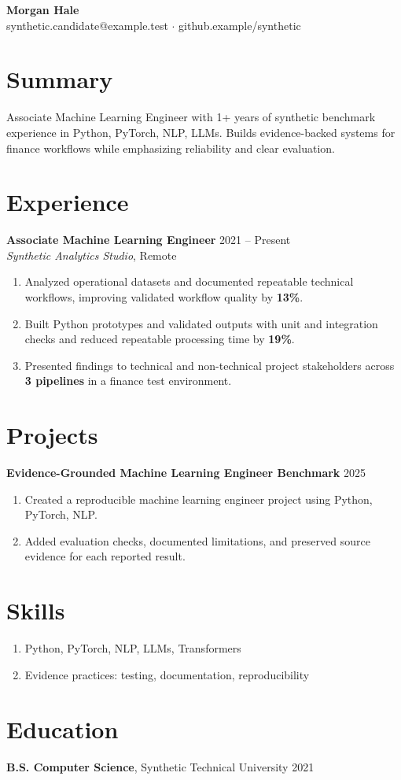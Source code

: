 \documentclass[10pt,letterpaper]{article}
\begin{document}
\begin{center}
{\Large \textbf{Morgan Hale}}\\
synthetic.candidate@example.test $\cdot$ github.example/synthetic
\end{center}

\section*{Summary}
Associate Machine Learning Engineer with 1+ years of synthetic benchmark experience in Python, PyTorch, NLP, LLMs. Builds evidence-backed systems for finance workflows while emphasizing reliability and clear evaluation.

\section*{Experience}
\textbf{Associate Machine Learning Engineer} \hfill 2021 -- Present\\
\textit{Synthetic Analytics Studio}, Remote
\begin{enumerate}
  \item Analyzed operational datasets and documented repeatable technical workflows, improving validated workflow quality by \textbf{13\%}.
  \item Built Python prototypes and validated outputs with unit and integration checks and reduced repeatable processing time by \textbf{19\%}.
  \item Presented findings to technical and non-technical project stakeholders across \textbf{3 pipelines} in a finance test environment.
\end{enumerate}

\section*{Projects}
\textbf{Evidence-Grounded Machine Learning Engineer Benchmark} \hfill 2025
\begin{enumerate}
  \item Created a reproducible machine learning engineer project using Python, PyTorch, NLP.
  \item Added evaluation checks, documented limitations, and preserved source evidence for each reported result.
\end{enumerate}

\section*{Skills}
\begin{enumerate}
  \item Python, PyTorch, NLP, LLMs, Transformers
  \item Evidence practices: testing, documentation, reproducibility
\end{enumerate}

\section*{Education}
\textbf{B.S. Computer Science}, Synthetic Technical University \hfill 2021
\end{document}
